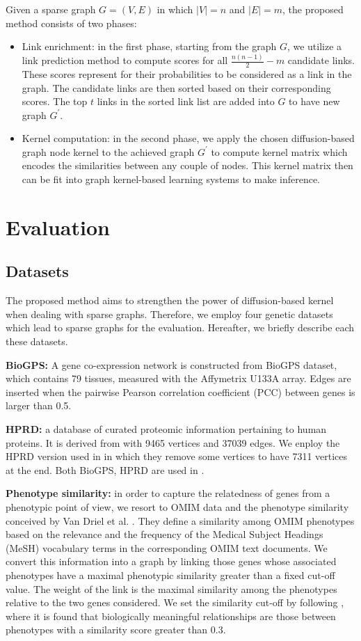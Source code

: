 \documentclass[runningheads,a4paper]{llncs}
\begin{document}
Given a sparse graph $G=(V, E)$ in which $|V| = n$ and $|E| = m$, the proposed method consists of two phases:
\begin{itemize}
\item Link enrichment: in the first phase, starting from the graph $G$, we utilize a link prediction method to compute scores for all $\frac{n(n-1)}{2}-m$ candidate links. These scores represent for their probabilities to be considered as a link in the graph. The candidate links are then sorted based on their corresponding scores. The top $t$ links in the sorted link list are added into $G$ to have new graph $G^{'}$.
\item Kernel computation: in the second phase, we apply the chosen diffusion-based graph node kernel to the achieved graph $G^{'}$ to compute kernel matrix which encodes the similarities between any couple of nodes. This kernel matrix then can be fit into graph kernel-based learning systems to make inference.
\end{itemize}
\section{Evaluation}
\label{evaluation}
\subsection{Datasets}
The proposed method aims to strengthen the power of diffusion-based kernel when dealing with sparse graphs. Therefore, we employ four genetic datasets which lead to sparse graphs for the evaluation. Hereafter, we briefly describe each these datasets.

\textbf{BioGPS:} A gene co-expression network is constructed from BioGPS dataset, which contains 79 tissues, measured with the Affymetrix U133A array. Edges are inserted when the pairwise Pearson correlation coefficient (PCC) between genes is larger than 0.5.

\textbf{HPRD:} a database of curated proteomic information pertaining to human proteins. It is derived from \cite{jour5} with 9465 vertices and 37039 edges. We enploy the HPRD version used in \cite{jour6} in which they remove some vertices to have 7311 vertices at the end. Both BioGPS, HPRD are used in \cite{proceeding3}.

\textbf{Phenotype similarity:} in order to capture the relatedness of genes from a phenotypic point of view, we resort to OMIM \cite{jour4} data and the phenotype similarity conceived by Van Driel et al. \cite{jour5}. They define a similarity among OMIM phenotypes based on the relevance and the frequency of the Medical Subject Headings (MeSH) vocabulary terms in the corresponding OMIM text documents. We convert this information into a graph by linking those genes whose associated phenotypes have a maximal phenotypic similarity greater than a fixed cut-off value. The weight of the link is the maximal similarity among the phenotypes relative to the two genes considered. We set the similarity cut-off by following \cite{jour5}, where it is found that biologically meaningful relationships are those between phenotypes with a similarity score greater than 0.3.
\end{document}
